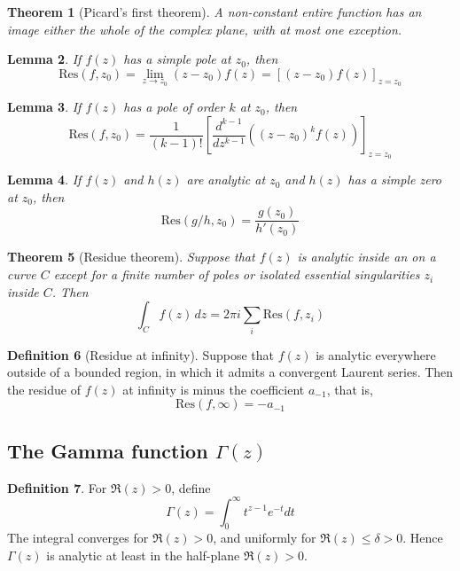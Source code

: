 \documentclass[10pt, oneside, reqno]{amsart}
\theoremstyle{plain}%
\newtheorem{thm}{Theorem}[section]
\newtheorem{lem}[thm]{Lemma}
\theoremstyle{definition}
\newtheorem{defn}[thm]{Definition}
\theoremstyle{remark}
\newcommand{\dzz}{\, dz}
\newcommand{\res}[2]{\text{Res}(#1,#2)}
\begin{document}
\begin{thm}[Picard's first theorem]
	A non-constant entire function has an image either the whole of the complex plane, with at most one exception.
\end{thm}

\begin{lem}
	If $f(z)$ has a simple pole at $z_0$, then \[
		\res{f}{z_0} = \lim_{z \rightarrow z_0} (z - z_0) f(z) = \left[(z-z_0) f(z) \right]_{z = z_0}
	\]
\end{lem}

\begin{lem}
	If $f(z)$ has a pole of order $k$ at $z_0$, then \[
		\res{f}{z_0} = \frac{1}{(k-1)!}\left[\frac{d^{k-1}}{dz^{k-1}} \left((z-z_0)^k f(z)\right) \right]_{z = z_0}
	\]
\end{lem}

\begin{lem}
	If $f(z)$ and $h(z)$ are analytic at $z_0$ and $h(z)$ has a simple zero at $z_0$, then \[
		\res{g/h}{z_0} = \frac{g(z_0)}{h'(z_0)}
	\]
\end{lem}


\begin{thm}[Residue theorem]
	Suppose that $f(z)$ is analytic inside an on a curve $C$ except for a finite number of poles or isolated essential singularities $z_i$ inside $C$.  Then \[
		\int_C f(z) \dzz = 2 \pi i \sum_{i} \res{f}{z_i}
	\]
\end{thm}

\begin{defn}[Residue at infinity]
	Suppose that $f(z)$ is analytic everywhere outside of a bounded region, in which it admits a convergent Laurent series.  Then the residue of $f(z)$ at infinity is minus the coefficient $a_{-1}$, that is,\[
		\res{f}{\infty} = -a_{-1}
	\]
\end{defn}




\subsection{The Gamma function $\Gamma(z)$} %
\label{sec:the_gamma_function_gamma_z_}


\begin{defn}
	For $\Re(z)> 0$, define \[
		\Gamma(z) = \int_0^\infty t^{z-1}e^{-t} dt
	\]
	The integral converges for $\Re(z)> 0$, and uniformly for $\Re(z) \leq \delta > 0$.  Hence $\Gamma(z)$ is analytic at least in the half-plane $\Re(z) > 0$.  
\end{defn}
\end{document}
